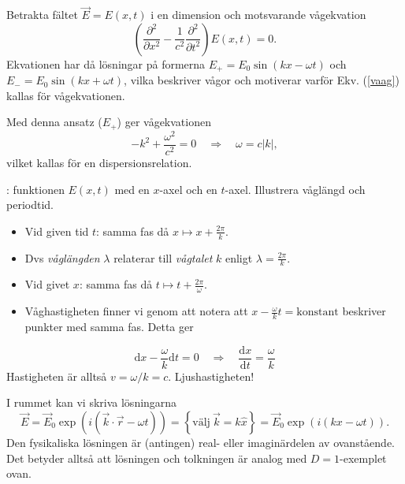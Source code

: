\documentclass[%
oneside,                 %
final,                   %
10pt]{article}
\newcommand{\shortinlinecomment}[3]{{\color{red}{\bf #1}: #2}}
\newenvironment{notice_mdfboxadmon}[1][]{
\begin{notice_mdfboxmdframed}[frametitle=#1]
}
{
\end{notice_mdfboxmdframed}
}
\begin{document}
\begin{notice_mdfboxadmon}[Exempel: Vågekvationen i $D=1$]

Betrakta fältet $\vec{E} = E(x,t)$ i en dimension och motsvarande vågekvation
\begin{equation}
  \left( \frac{\partial^2}{\partial x^2} - \frac{1}{c^2} \frac{\partial^2}{\partial t^2} \right) E(x,t) = 0.
\end{equation}
Ekvationen har då lösningar på formerna $E_+ = E_0 \sin(k x - \omega t)$ och $E_- = E_0 \sin(k x + \omega t)$, vilka beskriver vågor och motiverar varför Ekv. (\ref{vaag}) kallas för vågekvationen.

Med denna ansatz ($E_+$) ger vågekvationen
$$
-k^2 + \frac{\omega^2}{c^2} = 0 \quad \Rightarrow \quad \omega = c |k|,
$$
vilket kallas för en dispersionsrelation.

\shortinlinecomment{Rita 4}{ funktionen $E(x,t)$ med en $x$-axel och en $t$-axel. Illustrera våglängd och periodtid. }{ funktionen $E(x,t)$ med en }

\begin{itemize}
\item Vid given tid $t$: samma fas då $x \mapsto x + \frac{2 \pi}{k}$. 

\item Dvs \emph{våglängden} $\lambda$ relaterar till \emph{vågtalet} $k$ enligt $\lambda = \frac{2\pi}{k}$.

\item Vid givet $x$: samma fas då $t \mapsto t + \frac{2 \pi}{\omega}$. 

\item Våghastigheten finner vi genom att notera att $x-\frac{\omega}{k}t = \mathrm{konstant}$ beskriver punkter med samma fas. Detta ger
\end{itemize}

\noindent
$$
\mbox{d}x - \frac{\omega}{k} \mbox{d}t = 0 \quad \Rightarrow \quad \frac{\mbox{d}x}{\mbox{d}t} = \frac{\omega}{k}
$$
Hastigheten är alltså $v = \omega / k = c$. Ljushastigheten!
\end{notice_mdfboxadmon} %



I rummet kan vi skriva lösningarna
$$
\vec{E} = \vec{E}_0 \exp\left( i (\vec{k} \cdot \vec{r} - \omega t ) \right) = \left\{ \mathrm{välj~} \vec{k} = k \hat{x} \right\} = \vec{E}_0 \exp\left( i (k x - \omega t) \right).
$$
Den fysikaliska lösningen är (antingen) real- eller imaginärdelen av ovanstående. Det betyder alltså att lösningen och tolkningen är analog med $D=1$-exemplet ovan.
\end{document}
